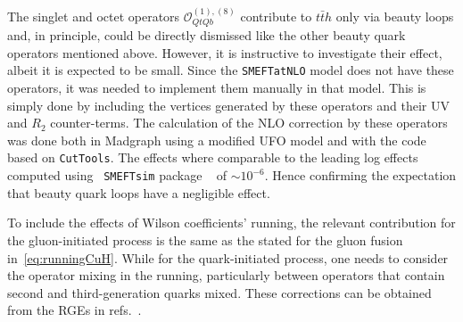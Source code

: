 	\par The singlet and octet operators $\mathcal{O}_{QtQb}^{(1),(8)}$  contribute to $t \bar{t} h$ only via beauty loops and, in principle, could be directly dismissed like the other beauty quark operators mentioned above. However, it is instructive to investigate their effect, albeit it is expected to be small.
	Since the \texttt{SMEFTatNLO} model does not have these operators, it was needed to implement them manually in that model. This is simply done by including the vertices generated by these operators and their UV and $R_2$ counter-terms. The calculation of the NLO correction by these operators was done both in Madgraph using a modified UFO model and with the code based on  \texttt{CutTools}. The effects where comparable to the leading log effects computed using ~\texttt{SMEFTsim} package ~\cite{Brivio:2017btx} of $ \sim 10^{-6}$. Hence confirming the expectation that beauty quark loops have a negligible effect. 
	\par To include the effects of Wilson coefficients' running, the relevant contribution for the gluon-initiated process is the same as the stated for the gluon fusion in~\eqref{eq:runningCuH}. While for the quark-initiated process, one needs to consider the operator mixing in the running, particularly between operators that contain second and third-generation quarks mixed. These corrections can be obtained from the RGEs in refs.~\cite{Jenkins:2013zja,Jenkins:2013wua, Alonso:2013hga}.
